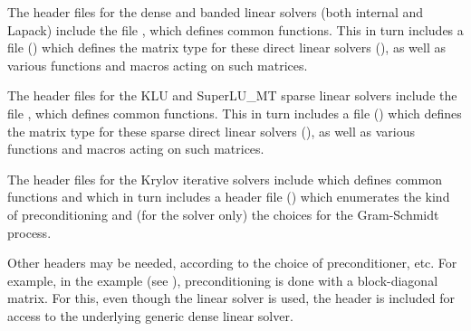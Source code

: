 The header files for the dense and banded linear solvers (both
internal and Lapack) include the file , which
defines common functions.  This in turn includes a file
() which defines the matrix type for these
direct linear solvers (), as well as various functions and
macros acting on such matrices.

The header files for the KLU and SuperLU\_MT sparse linear solvers
include the file , which defines common
functions. This in turn includes a file ()
which defines the matrix type for these sparse direct linear solvers
(), as well as various functions and macros acting on such
matrices. 

The header files for the Krylov iterative solvers include 
which defines common functions and which in turn includes a header file ()
which enumerates the kind of preconditioning and (for the {\spgmr} solver only) the choices for the Gram-Schmidt process.

Other headers may be needed, according to the choice of
preconditioner, etc.  For example, in the 
example (see \cite{idas_ex}), preconditioning is done with a
block-diagonal matrix. For this, even though the {\idaspgmr} linear
solver is used, the header  is included for
access to the underlying generic dense linear solver.

